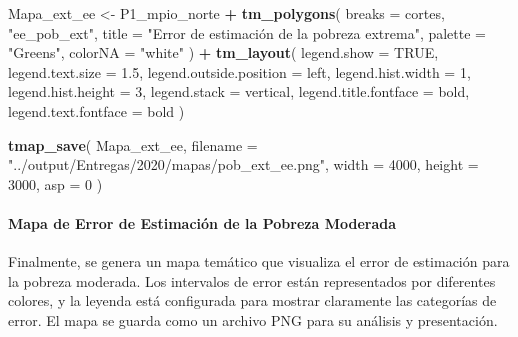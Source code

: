 \documentclass[
  12pt,
]{book}
\newenvironment{Shaded}{\begin{snugshade}}{\end{snugshade}}
\newcommand{\AttributeTok}[1]{\textcolor[rgb]{0.13,0.29,0.53}{#1}}
\newcommand{\ConstantTok}[1]{\textcolor[rgb]{0.56,0.35,0.01}{#1}}
\newcommand{\DecValTok}[1]{\textcolor[rgb]{0.00,0.00,0.81}{#1}}
\newcommand{\FloatTok}[1]{\textcolor[rgb]{0.00,0.00,0.81}{#1}}
\newcommand{\FunctionTok}[1]{\textcolor[rgb]{0.13,0.29,0.53}{\textbf{#1}}}
\newcommand{\NormalTok}[1]{#1}
\newcommand{\OtherTok}[1]{\textcolor[rgb]{0.56,0.35,0.01}{#1}}
\newcommand{\SpecialCharTok}[1]{\textcolor[rgb]{0.81,0.36,0.00}{\textbf{#1}}}
\newcommand{\StringTok}[1]{\textcolor[rgb]{0.31,0.60,0.02}{#1}}
\begin{document}
\begin{Shaded}
\begin{Highlighting}[]
\NormalTok{Mapa\_ext\_ee }\OtherTok{\textless{}{-}}
\NormalTok{  P1\_mpio\_norte }\SpecialCharTok{+} \FunctionTok{tm\_polygons}\NormalTok{(}
    \AttributeTok{breaks =}\NormalTok{ cortes,}
    \StringTok{"ee\_pob\_ext"}\NormalTok{,}
    \AttributeTok{title =} \StringTok{"Error de estimación de la pobreza extrema"}\NormalTok{,}
    \AttributeTok{palette =} \StringTok{"Greens"}\NormalTok{,}
    \AttributeTok{colorNA =} \StringTok{"white"}
\NormalTok{  ) }\SpecialCharTok{+} \FunctionTok{tm\_layout}\NormalTok{(}
    \AttributeTok{legend.show =} \ConstantTok{TRUE}\NormalTok{,}
    \AttributeTok{legend.text.size =} \FloatTok{1.5}\NormalTok{,}
    \AttributeTok{legend.outside.position =} \StringTok{\textquotesingle{}left\textquotesingle{}}\NormalTok{,}
    \AttributeTok{legend.hist.width =} \DecValTok{1}\NormalTok{,}
    \AttributeTok{legend.hist.height =} \DecValTok{3}\NormalTok{,}
    \AttributeTok{legend.stack =} \StringTok{\textquotesingle{}vertical\textquotesingle{}}\NormalTok{,}
    \AttributeTok{legend.title.fontface =} \StringTok{\textquotesingle{}bold\textquotesingle{}}\NormalTok{,}
    \AttributeTok{legend.text.fontface =} \StringTok{\textquotesingle{}bold\textquotesingle{}}
\NormalTok{  )}

\FunctionTok{tmap\_save}\NormalTok{(}
\NormalTok{  Mapa\_ext\_ee,}
  \AttributeTok{filename =} \StringTok{"../output/Entregas/2020/mapas/pob\_ext\_ee.png"}\NormalTok{,}
  \AttributeTok{width =} \DecValTok{4000}\NormalTok{,}
  \AttributeTok{height =} \DecValTok{3000}\NormalTok{,}
  \AttributeTok{asp =} \DecValTok{0}
\NormalTok{)}
\end{Highlighting}
\end{Shaded}

\hypertarget{mapa-de-error-de-estimaciuxf3n-de-la-pobreza-moderada}{%
\paragraph*{Mapa de Error de Estimación de la Pobreza Moderada}\label{mapa-de-error-de-estimaciuxf3n-de-la-pobreza-moderada}}

Finalmente, se genera un mapa temático que visualiza el error de estimación para la pobreza moderada. Los intervalos de error están representados por diferentes colores, y la leyenda está configurada para mostrar claramente las categorías de error. El mapa se guarda como un archivo PNG para su análisis y presentación.
\end{document}
